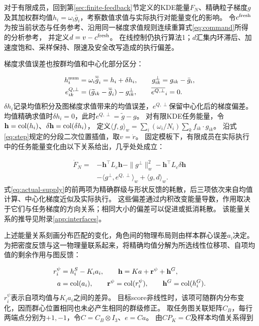 \documentclass[UTF8,a4paper,11pt,fontset=none]{ctexart}
\begin{document}
对于有限成员，回到第\ref{sec:finite-feedback}节定义的KDE能量$F_N$、精确粒子梯度$g$及其加权群均值$h_i=\omega_i\bar g_i$，考察数值求值与实际执行对能量变化的影响。
令$c^{\rm fresh}$为按当前状态与任务参考、沿用同一梯度求值规则连续重算式\eqref{eq:command}所得的分析参考，
并定义$d=v-c^{\rm fresh}$。
在线控制仍执行算法1；$d$汇集内环滞后、加速度饱和、采样保持、限速及安全改写造成的执行偏差。

梯度求值误差也按群均值和中心化部分区分：

\begin{equation}
\begin{aligned}
h_i^{\rm num}&=\omega_i\overline{\widetilde g}_i=h_i+\delta h_i,\qquad
g^\perp_{ik}=g_{ik}-\bar g_i,\\
e^{Q,\perp}_{ik}&=(\widetilde g_{ik}-\overline{\widetilde g}_i)-g^\perp_{ik},
\qquad\overline{e^{Q,\perp}}_i=0.
\end{aligned}
\label{eq:gradient-errors}
\end{equation}
$\delta h_i$记录均值积分及图梯度求值带来的均值误差，$e^{Q,\perp}$保留中心化后的梯度偏差。
均值精确求值时$\delta h_i=0$，此时$e^{Q,\perp}=\widetilde g-g$。
对有限KDE任务能量，令$\mathbf h=\operatorname{col}(h_i)$、$\delta\mathbf h=\operatorname{col}(\delta h_i)$，
定义$\langle f,g\rangle_w=\sum_i(\omega_i/N_i)\sum_kf_{ik}\cdot g_{ik}$。
沿式\eqref{eq:step}规定的分段二次位置插值，取$v=\dot r$。
固定模板下，有限成员在实际执行中的任务能量变化由以下关系给出，几乎处处成立：

\begin{equation}
\begin{aligned}
\dot F_N={}&-\mathbf h^\top L_c\mathbf h-\|g^\perp\|_w^2
-\mathbf h^\top L_c\delta\mathbf h\\
&-\langle g^\perp,e^{Q,\perp}\rangle_w+\langle g,d\rangle_w .
\end{aligned}
\label{eq:actual-supply}
\end{equation}
式\eqref{eq:actual-supply}的前两项为精确群级与形状反馈的耗散，后三项依次来自均值计算、中心化梯度近似及实际执行。
这些偏差通过内积改变能量导数，作用取决于它们与任务梯度的方向关系；相同大小的偏差可以促进或抵消耗散。
该能量关系的推导见附录\ref{app:interfaces}。

上述能量关系刻画分布匹配的变化，角色间的物理布局则由样本群心误差$a_i$决定。
为把密度反馈与这一物理量联系起来，将精确均值分解为所选线性位移项、自项均值的剩余作用与图反馈：

\begin{equation}
\begin{aligned}
r_i^\psi&=h_i^S-K_i a_i,\qquad \mathbf h=Ka+\mathbf r^\psi+\mathbf h^G,\\
a&=\operatorname{col}(a_i),\qquad \mathbf r^\psi=\operatorname{col}(r_i^\psi),\qquad\mathbf h^G=\operatorname{col}(h_i^G).
\end{aligned}
\label{eq:shape-drive}
\end{equation}
$r_i^\psi$表示自项均值与$K_i a_i$之间的差异。
目标score非线性时，该项可随群内分布变化，因而群心位置相同也未必产生相同的群级修正。
取任务图关联矩阵$C_B$，每行两端点分别为$+1,-1$，令$C=C_B\otimes I_3$、$e=Ca$。
由$CP_K=C$及样本均值关系得到
\end{document}
